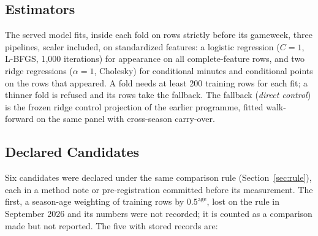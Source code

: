 \documentclass[11pt,a4paper]{article}
\begin{document}
\subsection{Estimators}

The served model fits, inside each fold on rows strictly before its gameweek, three pipelines, scaler included, on standardized features: a logistic regression ($C = 1$, L-BFGS, 1{,}000 iterations) for appearance on all complete-feature rows, and two ridge regressions ($\alpha = 1$, Cholesky) for conditional minutes and conditional points on the rows that appeared. A fold needs at least 200 training rows for each fit; a thinner fold is refused and its rows take the fallback. The fallback (\emph{direct control}) is the frozen ridge control projection of the earlier programme, fitted walk-forward on the same panel with cross-season carry-over.

\subsection{Declared Candidates}
\label{sec:candidates}

Six candidates were declared under the same comparison rule (Section~\ref{sec:rule}), each in a method note or pre-registration committed before its measurement. The first, a season-age weighting of training rows by $0.5^{\text{age}}$, lost on the rule in September 2026 and its numbers were not recorded; it is counted as a comparison made but not reported. The five with stored records are:
\end{document}

